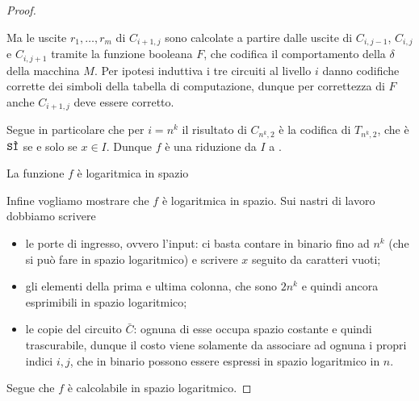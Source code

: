 \begin{proof}
\begin{description}
      Ma le uscite $r_1, \dots, r_m$ di $C_{i+1, j}$ sono calcolate a partire
      dalle uscite di $C_{i, j-1}$, $C_{i, j}$ e $C_{i, j+1}$ tramite la funzione
      booleana $F$, che codifica il comportamento della $\delta$ della macchina
      $M$. Per ipotesi induttiva i tre circuiti al livello $i$ danno codifiche
      corrette dei simboli della tabella di computazione, dunque per correttezza
      di $F$ anche $C_{i+1, j}$ deve essere corretto.       
  \end{description}

  Segue in particolare che per $i = n^{\!k}$ il risultato di $C_{n^{\!k}, 2}$ è la codifica
  di $T_{n^{\!k}, 2}$, che è $\SI$ se e solo se $x \in I$. Dunque $f$ è una riduzione
  da $I$ a \CVAL.

  \medskip
  \textsf{\color{RoyalBlue} La funzione $f$ è logaritmica in spazio}
  
  Infine vogliamo mostrare che $f$ è logaritmica in spazio. Sui nastri di lavoro
  dobbiamo scrivere \begin{itemize}
    \item le porte di ingresso, ovvero l'input: ci basta contare in binario fino
      ad $n^{\!k}$ (che si può fare in spazio logaritmico) e scrivere $x$ seguito da
      caratteri vuoti;
    \item gli elementi della prima e ultima colonna, che sono $2n^{\!k}$ e quindi 
      ancora esprimibili in spazio logaritmico;
    \item le copie del circuito $\bar C$: ognuna di esse occupa spazio costante
      e quindi trascurabile, dunque il costo viene solamente da associare ad ognuna
      i propri indici $i, j$, che in binario possono essere espressi in spazio
      logaritmico in $n$.  
  \end{itemize}
  Segue che $f$ è calcolabile in spazio logaritmico.
\end{proof}


